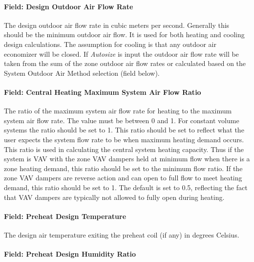 \paragraph{Field: Design Outdoor Air Flow Rate}\label{field-design-outdoor-air-flow-rate}

The design outdoor air flow rate in cubic meters per second. Generally this should be the minimum outdoor air flow. It is used for both heating and cooling design calculations. The assumption for cooling is that any outdoor air economizer will be closed. If \emph{Autosize} is input the outdoor air flow rate will be taken from the sum of the zone outdoor air flow rates or calculated based on the System Outdoor Air Method selection (field below).

\paragraph{Field: Central Heating Maximum System Air Flow Ratio}\label{field-central-heating-maximum-system-air-flow-ratio}

The ratio of the maximum system air flow rate for heating to the maximum system air flow rate. The value must be between 0 and 1. For constant volume systems the ratio should be set to 1. This ratio should be set to reflect what the user expects the system flow rate to be when maximum heating demand occurs. This ratio is used in calculating the central system heating capacity. Thus if the system is VAV with the zone VAV dampers held at minimum flow when there is a zone heating demand, this ratio should be set to the minimum flow ratio. If the zone VAV dampers are reverse action and can open to full flow to meet heating demand, this ratio should be set to 1. The default is set to 0.5, reflecting the fact that VAV dampers are typically not allowed to fully open during heating.

\paragraph{Field: Preheat Design Temperature}\label{field-preheat-design-temperature}

The design air temperature exiting the preheat coil (if any) in degrees Celsius.

\paragraph{Field: Preheat Design Humidity Ratio}\label{field-preheat-design-humidity-ratio}

